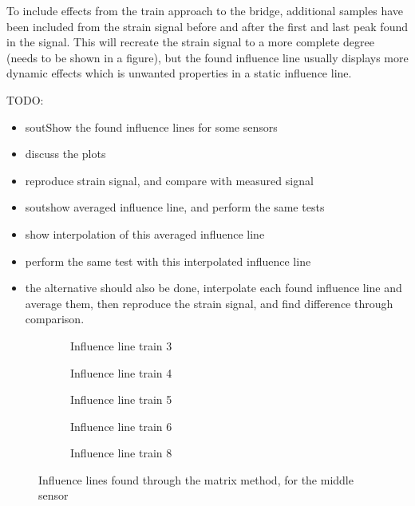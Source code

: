 To include effects from the train approach to the bridge, additional samples have been included from the strain signal before and after the first and last peak found in the signal. This will recreate the strain signal to a more complete degree (needs to be shown in a figure), but the found influence line usually displays more dynamic effects which is unwanted properties in a static influence line.

TODO:
\begin{itemize}
\item sout{Show the found influence lines for some sensors}
\item discuss the plots
\item reproduce strain signal, and compare with measured signal
\item sout{show averaged influence line}, and perform the same tests
\item show interpolation of this averaged influence line
\item perform the same test with this interpolated influence line
\item the alternative should also be done, interpolate each found influence line and average them, then reproduce the strain signal, and find difference through comparison.
\end{itemize}


\begin{figure}[H]
\centering
\begin{subfigure}[t]{0.4\textwidth}
	\centering
	
	\caption{Influence line train 3}
	\label{fig:train3}
\end{subfigure}
\qquad
\begin{subfigure}[t]{0.4\textwidth}
	\centering
	
	\caption{Influence line train 4}
	\label{fig:train4}
\end{subfigure}

\begin{subfigure}[t]{0.4\textwidth}
	\centering
	
	\caption{Influence line train 5}
	\label{fig:train5}
\end{subfigure}
\qquad
\begin{subfigure}[t]{0.4\textwidth}
	\centering
	
	\caption{Influence line train 6}
	\label{fig:train6}
\end{subfigure}

\begin{subfigure}[t]{0.9\textwidth}
	\centering
	
	\caption{Influence line train 8}
	\label{fig:train8}
\end{subfigure}
\caption{Influence lines found through the matrix method, for the middle sensor}
\label{fig:Influence_lines}
\end{figure}



